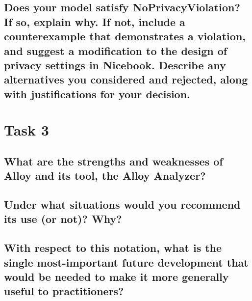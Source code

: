 \documentclass[titlepage]{article}
\begin{document}
\subsection{Does your model satisfy NoPrivacyViolation? If so, explain why. If not, include a counterexample that
	demonstrates a violation, and suggest a modification to the design of privacy settings in Nicebook. Describe
	any alternatives you considered and rejected, along with justifications for your decision.}

\section{Task 3}
\subsection{What are the strengths and weaknesses of Alloy and its tool, the Alloy Analyzer?}
\subsection{Under what situations would you recommend its use (or not)? Why?}
\subsection{With respect to this notation, what is the single most-important future development that would be needed to
	make it more generally useful to practitioners?}
\end{document}
